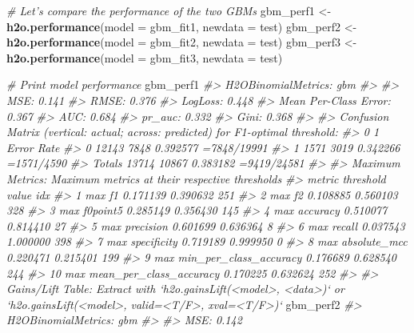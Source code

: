 \documentclass[]{book}
\newenvironment{Shaded}{\begin{snugshade}}{\end{snugshade}}
\newcommand{\CommentTok}[1]{\textcolor[rgb]{0.56,0.35,0.01}{\textit{#1}}}
\newcommand{\DataTypeTok}[1]{\textcolor[rgb]{0.13,0.29,0.53}{#1}}
\newcommand{\KeywordTok}[1]{\textcolor[rgb]{0.13,0.29,0.53}{\textbf{#1}}}
\newcommand{\NormalTok}[1]{#1}
\newcommand{\StringTok}[1]{\textcolor[rgb]{0.31,0.60,0.02}{#1}}
\begin{document}
\begin{Shaded}
\begin{Highlighting}[]
\CommentTok{# Let's compare the performance of the two GBMs}
\NormalTok{gbm_perf1 <-}\StringTok{ }\KeywordTok{h2o.performance}\NormalTok{(}\DataTypeTok{model =}\NormalTok{ gbm_fit1,}
                             \DataTypeTok{newdata =}\NormalTok{ test)}
\NormalTok{gbm_perf2 <-}\StringTok{ }\KeywordTok{h2o.performance}\NormalTok{(}\DataTypeTok{model =}\NormalTok{ gbm_fit2,}
                             \DataTypeTok{newdata =}\NormalTok{ test)}
\NormalTok{gbm_perf3 <-}\StringTok{ }\KeywordTok{h2o.performance}\NormalTok{(}\DataTypeTok{model =}\NormalTok{ gbm_fit3,}
                             \DataTypeTok{newdata =}\NormalTok{ test)}

\CommentTok{# Print model performance}
\NormalTok{gbm_perf1}
\CommentTok{#> H2OBinomialMetrics: gbm}
\CommentTok{#> }
\CommentTok{#> MSE:  0.141}
\CommentTok{#> RMSE:  0.376}
\CommentTok{#> LogLoss:  0.448}
\CommentTok{#> Mean Per-Class Error:  0.367}
\CommentTok{#> AUC:  0.684}
\CommentTok{#> pr_auc:  0.332}
\CommentTok{#> Gini:  0.368}
\CommentTok{#> }
\CommentTok{#> Confusion Matrix (vertical: actual; across: predicted) for F1-optimal threshold:}
\CommentTok{#>            0     1    Error         Rate}
\CommentTok{#> 0      12143  7848 0.392577  =7848/19991}
\CommentTok{#> 1       1571  3019 0.342266   =1571/4590}
\CommentTok{#> Totals 13714 10867 0.383182  =9419/24581}
\CommentTok{#> }
\CommentTok{#> Maximum Metrics: Maximum metrics at their respective thresholds}
\CommentTok{#>                         metric threshold    value idx}
\CommentTok{#> 1                       max f1  0.171139 0.390632 251}
\CommentTok{#> 2                       max f2  0.108885 0.560103 328}
\CommentTok{#> 3                 max f0point5  0.285149 0.356430 145}
\CommentTok{#> 4                 max accuracy  0.510077 0.814410  27}
\CommentTok{#> 5                max precision  0.601699 0.636364   8}
\CommentTok{#> 6                   max recall  0.037543 1.000000 398}
\CommentTok{#> 7              max specificity  0.719189 0.999950   0}
\CommentTok{#> 8             max absolute_mcc  0.220471 0.215401 199}
\CommentTok{#> 9   max min_per_class_accuracy  0.176689 0.628540 244}
\CommentTok{#> 10 max mean_per_class_accuracy  0.170225 0.632624 252}
\CommentTok{#> }
\CommentTok{#> Gains/Lift Table: Extract with `h2o.gainsLift(<model>, <data>)` or `h2o.gainsLift(<model>, valid=<T/F>, xval=<T/F>)`}
\NormalTok{gbm_perf2}
\CommentTok{#> H2OBinomialMetrics: gbm}
\CommentTok{#> }
\CommentTok{#> MSE:  0.142}

\end{Highlighting}
\end{Shaded}
\end{document}
